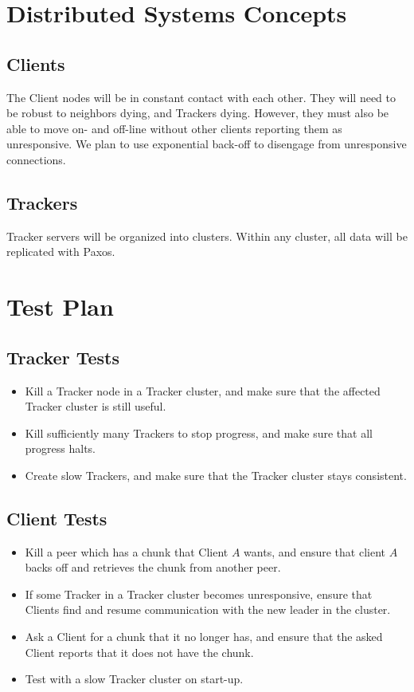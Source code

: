 \documentclass[12pt]{article}
\begin{document}
\section*{Distributed Systems Concepts}

\subsection*{Clients}
The Client nodes will be in constant contact with each other.
They will need to be robust to neighbors dying, and Trackers dying.
However, they must also be able to move on- and off-line without other clients
reporting them as unresponsive.
We plan to use exponential back-off to disengage from unresponsive connections.

\subsection*{Trackers}
Tracker servers will be organized into clusters.
Within any cluster, all data will be replicated with Paxos.

\section*{Test Plan}

\subsection*{Tracker Tests}
\begin{itemize}
\item  Kill a Tracker node in a Tracker cluster,
       and make sure that the affected Tracker cluster is still useful.
\item  Kill sufficiently many Trackers to stop progress,
       and make sure that all progress halts.
\item  Create slow Trackers,
       and make sure that the Tracker cluster stays consistent.
\end{itemize}

\subsection*{Client Tests}
\begin{itemize}
\item  Kill a peer which has a chunk that Client $A$ wants, and ensure that
       client $A$ backs off and retrieves the chunk from another peer.
\item  If some Tracker in a Tracker cluster becomes unresponsive, ensure that
       Clients find and resume communication with the new leader in the cluster.
\item  Ask a Client for a chunk that it no longer has, and ensure that the asked
       Client reports that it does not have the chunk.
\item  Test with a slow Tracker cluster on start-up.
\end{itemize}
\end{document}
